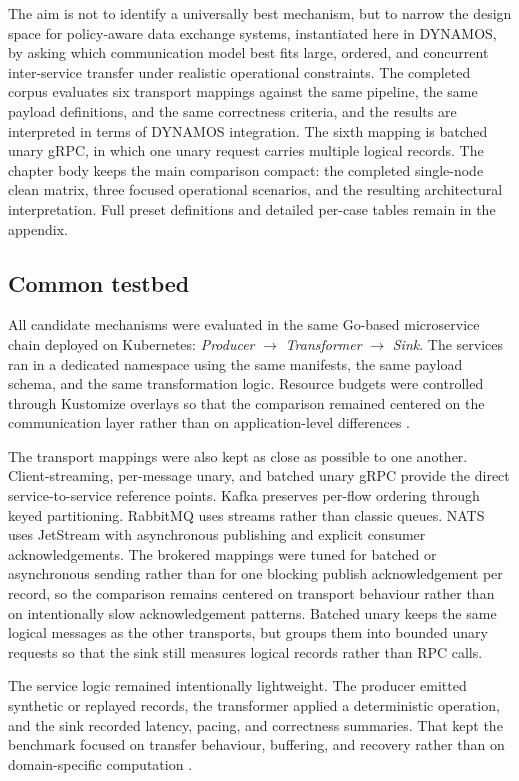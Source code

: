 The aim is not to identify a universally best mechanism, but to narrow the design space for policy-aware data exchange systems, instantiated here in DYNAMOS, by asking which communication model best fits large, ordered, and concurrent inter-service transfer under realistic operational constraints. The completed corpus evaluates six transport mappings against the same pipeline, the same payload definitions, and the same correctness criteria, and the results are interpreted in terms of DYNAMOS integration. The sixth mapping is batched unary gRPC, in which one unary request carries multiple logical records. The chapter body keeps the main comparison compact: the completed single-node clean matrix, three focused operational scenarios, and the resulting architectural interpretation. Full preset definitions and detailed per-case tables remain in the appendix.

\subsection{Common testbed}

All candidate mechanisms were evaluated in the same Go-based microservice chain deployed on Kubernetes: \emph{Producer} $\rightarrow$ \emph{Transformer} $\rightarrow$ \emph{Sink}. The services ran in a dedicated namespace using the same manifests, the same payload schema, and the same transformation logic. Resource budgets were controlled through Kustomize overlays so that the comparison remained centered on the communication layer rather than on application-level differences \cite{karimov2018benchmarking,Henning2021ScalabilityMetrics}.

The transport mappings were also kept as close as possible to one another. Client-streaming, per-message unary, and batched unary gRPC provide the direct service-to-service reference points. Kafka preserves per-flow ordering through keyed partitioning. RabbitMQ uses streams rather than classic queues. NATS uses JetStream with asynchronous publishing and explicit consumer acknowledgements. The brokered mappings were tuned for batched or asynchronous sending rather than for one blocking publish acknowledgement per record, so the comparison remains centered on transport behaviour rather than on intentionally slow acknowledgement patterns. Batched unary keeps the same logical messages as the other transports, but groups them into bounded unary requests so that the sink still measures logical records rather than RPC calls.

The service logic remained intentionally lightweight. The producer emitted synthetic or replayed records, the transformer applied a deterministic operation, and the sink recorded latency, pacing, and correctness summaries. That kept the benchmark focused on transfer behaviour, buffering, and recovery rather than on domain-specific computation \cite{coviello2022dataxc,systematicstreaming}.

